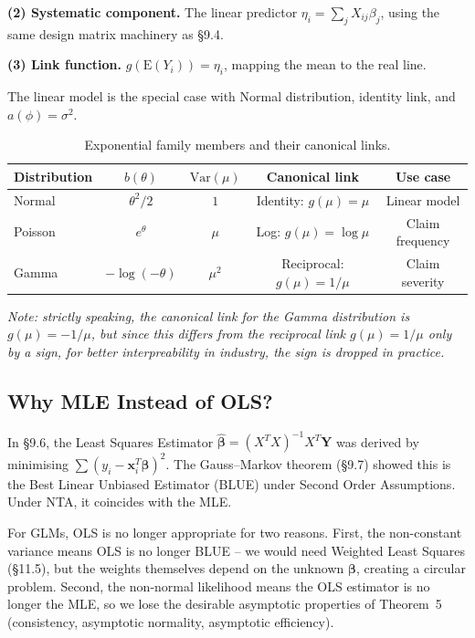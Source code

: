\documentclass[11pt]{article}
\begin{document}
\noindent \textbf{(2) Systematic component.} The linear predictor $\eta_i = \sum_j X_{ij}\beta_j$,
using the same design matrix machinery as \S9.4.

\noindent \textbf{(3) Link function.} $g(\mathrm{E}(Y_i)) = \eta_i$, mapping the mean to the
real line.

\noindent The linear model is the special case with Normal distribution, identity link, and
$a(\phi)=\sigma^2$.

\begin{table}[H]
    \centering
    \caption{Exponential family members and their canonical links.}
    \label{tab:exp_family}
    \begin{tabular}{lcccc}
        \toprule
        \textbf{Distribution} & $b(\theta)$ & $\mathrm{Var}(\mu)$ & \textbf{Canonical link} & \textbf{Use case} \\
        \midrule
        Normal & $\theta^2/2$ & $1$ & Identity: $g(\mu)=\mu$ & Linear model \\
        Poisson & $e^\theta$ & $\mu$ & Log: $g(\mu)=\log\mu$ & Claim frequency \\
        Gamma & $-\log(-\theta)$ & $\mu^2$ & Reciprocal: $g(\mu)=1/\mu$ & Claim severity \\
        \bottomrule
    \end{tabular}
\end{table}

\noindent \textit{Note: strictly speaking, the canonical link for the Gamma 
distribution is $g(\mu) = -1/\mu$, but since this differs from the 
reciprocal link $g(\mu) = 1/\mu$ only by a sign, for better interpreability  
in industry, the sign is dropped in practice.}

\subsection{Why MLE Instead of OLS?}

In \S9.6, the Least Squares Estimator $\hat{\boldsymbol{\beta}} = (X^TX)^{-1}X^T\mathbf{Y}$ was derived
by minimising $\sum(y_i - \mathbf{x}_i^T\boldsymbol{\beta})^2$. The Gauss--Markov theorem (\S9.7) showed
this is the Best Linear Unbiased Estimator (BLUE) under Second Order Assumptions. Under NTA, it coincides with the MLE.

\noindent For GLMs, OLS is no longer appropriate for two reasons. First, the non-constant
variance means OLS is no longer BLUE -- we would need Weighted Least Squares
(\S11.5), but the weights themselves depend on the unknown $\boldsymbol{\beta}$, creating a
circular problem. Second, the non-normal likelihood means the OLS estimator is no longer
the MLE, so we lose the desirable asymptotic properties of Theorem~5 (consistency,
asymptotic normality, asymptotic efficiency).
\end{document}
